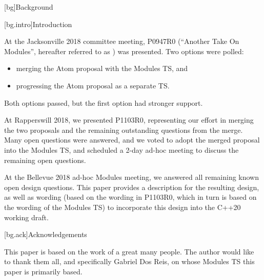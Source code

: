 \setcounter{chapter}{0}
[bg]{Background}

[bg.intro]{Introduction}

At the Jacksonville 2018 committee meeting,
P0947R0 (``Another Take On Modules'',
hereafter referred to as )
was presented. Two options were polled:

\begin{itemize}
\item merging the Atom proposal with the Modules TS, and
\item progressing the Atom proposal as a separate TS.
\end{itemize}

Both options passed, but the first option had stronger support.

At Rapperswill 2018, we presented P1103R0, representing
our effort in merging the two proposals
and the remaining outstanding questions from the merge.
Many open questions were answered, and we voted to adopt the
merged proposal into the Modules TS, and
scheduled a 2-day ad-hoc meeting to discuss the remaining
open questions.

At the Bellevue 2018 ad-hoc Modules meeting, we answered all
remaining known open design questions. This paper provides a
description for the resulting design, as well as wording
(based on the wording in P1103R0, which in turn is based on
the wording of the Modules TS) to incorporate this design
into the C++20 working draft.

[bg.ack]{Acknowledgements}

This paper is based on the work of a great many people.
The author would like to thank them all, and specifically
Gabriel Dos Reis, on whose Modules TS this paper is primarily
based.

%
%
%
%

